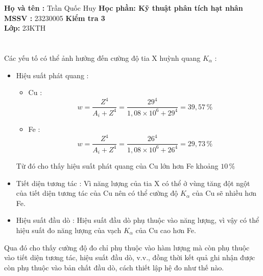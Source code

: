 \documentclass[a4paper]{article}
\begin{document}
\noindent 
{\bf Họ và tên : }Trần Quốc Huy 
\hfill
{\bf Học phần: Kỹ thuật phân tích hạt nhân} \\
{\bf MSSV :} 23230005
\hfill
{\bf Kiểm tra 3} \\
{\bf Lớp:} 23KTH

\hrulefill

\section{}
Các yếu tố có thể ảnh hưởng đến cường độ tia X huỳnh quang $K_\alpha$ : 
\begin{itemize}
    \item Hiệu suất phát quang : 
    \begin{itemize}
        \item Cu : 
        $$w = \frac{Z^4}{A_i + Z^4} = \frac{29^4}{1,08 \times 10^6 + 29^4} = 39,57 \, \%$$
        \item Fe : $$w = \frac{Z^4}{A_i + Z^4} = \frac{26^4}{1,08 \times 10^6 + 26^4} = 29,73 \, \%$$
    \end{itemize}
    Từ đó cho thấy hiệu suất phát quang của Cu lớn hơn Fe khoảng $10\, \%$ 
    \item Tiết diện tương tác : Vì năng lượng của tia X có thể ở vùng tăng đột ngột của tiết diện tương tác của Cu nên có thể cường độ $K_\alpha$ của Cu sẽ nhiều hơn Fe.
    \item Hiệu suất đầu dò : Hiệu suất đầu dò phụ thuộc vào năng lượng, vì vậy có thể hiệu suất đo năng lượng của vạch $K_\alpha$ của Cu cao hơn Fe.
\end{itemize}
Qua đó cho thấy cường độ đo chỉ phụ thuộc vào hàm lượng mà còn phụ thuộc vào tiết diện tương tác, hiệu suất đầu dò, v.v., đồng thời kết quả ghi nhận được còn phụ thuộc vào bản chất đầu dò, cách thiết lập hệ đo như thế nào.
\end{document}
